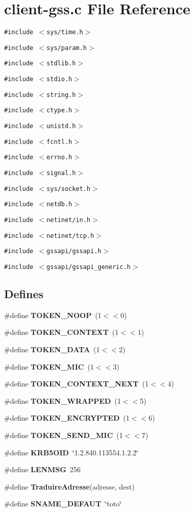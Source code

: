 \section{client-gss.c File Reference}
\label{client-gss_8c}
{\tt \#include $<$sys/time.h$>$}\par
{\tt \#include $<$sys/param.h$>$}\par
{\tt \#include $<$stdlib.h$>$}\par
{\tt \#include $<$stdio.h$>$}\par
{\tt \#include $<$string.h$>$}\par
{\tt \#include $<$ctype.h$>$}\par
{\tt \#include $<$unistd.h$>$}\par
{\tt \#include $<$fcntl.h$>$}\par
{\tt \#include $<$errno.h$>$}\par
{\tt \#include $<$signal.h$>$}\par
{\tt \#include $<$sys/socket.h$>$}\par
{\tt \#include $<$netdb.h$>$}\par
{\tt \#include $<$netinet/in.h$>$}\par
{\tt \#include $<$netinet/tcp.h$>$}\par
{\tt \#include $<$gssapi/gssapi.h$>$}\par
{\tt \#include $<$gssapi/gssapi\_\-generic.h$>$}\par
\subsection*{Defines}
\begin{CompactItemize}
\item 
\#define {\bf TOKEN\_\-NOOP}\ (1$<$$<$0)
\item 
\#define {\bf TOKEN\_\-CONTEXT}\ (1$<$$<$1)
\item 
\#define {\bf TOKEN\_\-DATA}\ (1$<$$<$2)
\item 
\#define {\bf TOKEN\_\-MIC}\ (1$<$$<$3)
\item 
\#define {\bf TOKEN\_\-CONTEXT\_\-NEXT}\ (1$<$$<$4)
\item 
\#define {\bf TOKEN\_\-WRAPPED}\ (1$<$$<$5)
\item 
\#define {\bf TOKEN\_\-ENCRYPTED}\ (1$<$$<$6)
\item 
\#define {\bf TOKEN\_\-SEND\_\-MIC}\ (1$<$$<$7)
\item 
\#define {\bf KRB5OID}\ \char`\"{}1.2.840.113554.1.2.2\char`\"{}
\item 
\#define {\bf LENMSG}\ 256
\item 
\#define {\bf Traduire\-Adresse}(adresse, dest)
\item 
\#define {\bf SNAME\_\-DEFAUT}\ \char`\"{}toto\char`\"{}
\end{CompactItemize}
